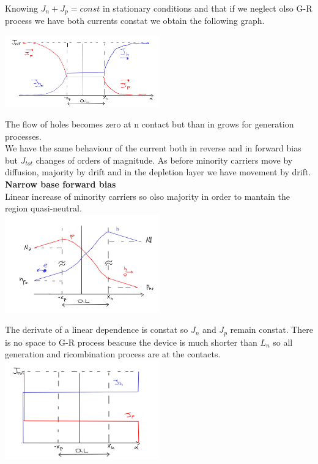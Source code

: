 Knowing $J_n+J_p=const$ in stationary conditions and that if we neglect olso G-R process we have both currents constat we obtain the following graph.

\centering
\includegraphics[width=0.5\textwidth]{wbrb.png}\\
\raggedright

The flow of holes becomes zero at n contact but than in grows for generation processes.\\
We have the same behaviour of the current both in reverse and in forward bias but $J_{tot}$ changes of orders of magnitude. As before minority carriers move by diffusion, majority by drift and in the depletion layer we have movement by drift.\\

{\bf Narrow base forward bias}\\
Linear increase of minority carriers so olso majority in order to mantain the region quasi-neutral.\\

\centering
\includegraphics[width=0.5\textwidth]{nbfb.png}\\
\raggedright

The derivate of a linear dependence is constat so $J_n$ and $J_p$ remain constat. There is no space to G-R process beacuse the device is much shorter than $L_n$ so all generation and ricombination process are at the contacts.\\


\centering
\includegraphics[width=0.5\textwidth]{nbJf.png}\\
\raggedright

